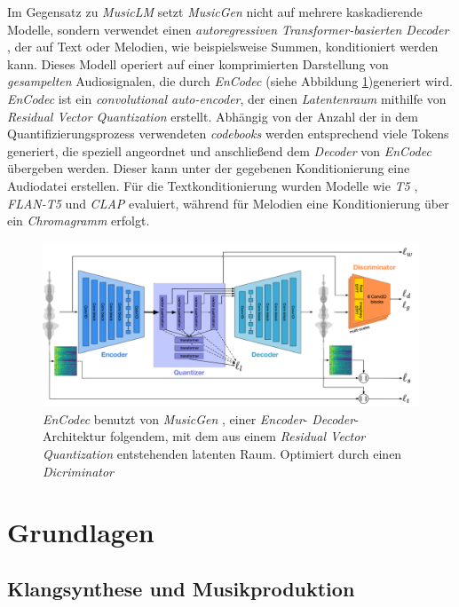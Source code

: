 \documentclass[
  a4paper,  %
  twoside,  %
  bibliography=totoc,
  headsepline,
  cleardoublepage=empty,
  parskip=half,
  draft=false
]{scrbook}
\begin{document}
Im Gegensatz zu \emph{MusicLM} \cite{copet_simple_2023} setzt \emph{MusicGen} nicht auf mehrere kaskadierende Modelle, sondern verwendet einen \emph{autoregressiven Transformer-basierten Decoder} \cite{vaswani_attention_2017}, der auf Text oder Melodien, wie beispielsweise Summen, konditioniert werden kann. Dieses Modell operiert auf einer komprimierten Darstellung von \emph{gesampelten} Audiosignalen, die durch \emph{EnCodec} \cite{defossez_high_2022} (siehe Abbildung \ref{fig:encodec})generiert wird. \emph{EnCodec} ist ein \emph{convolutional auto-encoder}, der einen \emph{Latentenraum} mithilfe von \emph{Residual Vector Quantization} \cite{zeghidour_soundstream_2021} erstellt. Abhängig von der Anzahl der in dem Quantifizierungsprozess verwendeten \emph{codebooks} werden entsprechend viele Tokens generiert, die speziell angeordnet und anschließend dem \emph{Decoder} von \emph{EnCodec} übergeben werden. Dieser kann unter der gegebenen Konditionierung eine Audiodatei erstellen. Für die Textkonditionierung wurden Modelle wie \emph{T5} \cite{raffel_exploring_2020}, \emph{FLAN-T5} \cite{roberts_scaling_2022} und \emph{CLAP} evaluiert, während für Melodien eine Konditionierung über ein \emph{Chromagramm} erfolgt. \cite{copet_simple_2023}

\begin{figure}[h]
  \centering
  \includegraphics[width=.7\textwidth]{graphics/MusicGen.png}
  \caption[MusicGen EnCodec]{\emph{EnCodec} \cite{defossez_high_2022} benutzt von \emph{MusicGen} \cite{copet_simple_2023}, einer \emph{Encoder}- \emph{Decoder}-Architektur folgendem, mit dem aus einem \emph{Residual Vector Quantization} entstehenden latenten Raum. Optimiert durch einen \emph{Dicriminator} \cite{defossez_high_2022}}
  \label{fig:encodec}
\end{figure}

\chapter{Grundlagen}

\section{Klangsynthese und Musikproduktion}
\end{document}
